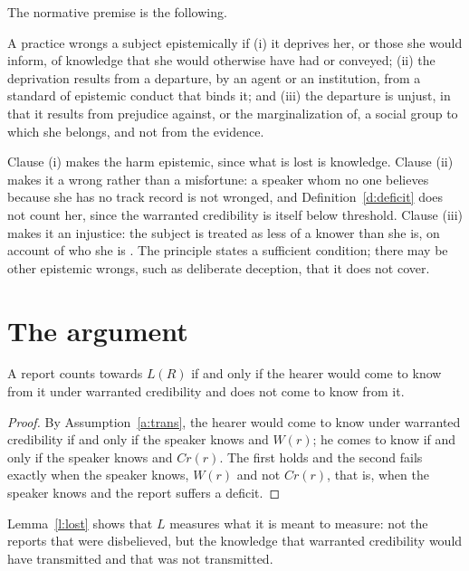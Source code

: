 \documentclass{situationist-preprint}
\begin{document}
The normative premise is the following.

\begin{principle}\label{p:wrong}
A practice wrongs a subject epistemically if (i) it deprives her, or those she would inform, of knowledge that she would otherwise have had or conveyed; (ii) the deprivation results from a departure, by an agent or an institution, from a standard of epistemic conduct that binds it; and (iii) the departure is unjust, in that it results from prejudice against, or the marginalization of, a social group to which she belongs, and not from the evidence.
\end{principle}

Clause (i) makes the harm epistemic, since what is lost is knowledge. Clause (ii) makes it a wrong rather than a misfortune: a speaker whom no one believes because she has no track record is not wronged, and Definition~\ref{d:deficit} does not count her, since the warranted credibility is itself below threshold. Clause (iii) makes it an injustice: the subject is treated as less of a knower than she is, on account of who she is \citep{Fricker2007}. The principle states a sufficient condition; there may be other epistemic wrongs, such as deliberate deception, that it does not cover.

\section{The argument}

\begin{lemma}\label{l:lost}
A report counts towards $L(R)$ if and only if the hearer would come to know from it under warranted credibility and does not come to know from it.
\end{lemma}

\begin{proof}
By Assumption~\ref{a:trans}, the hearer would come to know under warranted credibility if and only if the speaker knows and $W(r)$; he comes to know if and only if the speaker knows and $\mathit{Cr}(r)$. The first holds and the second fails exactly when the speaker knows, $W(r)$ and not $\mathit{Cr}(r)$, that is, when the speaker knows and the report suffers a deficit.
\end{proof}

Lemma~\ref{l:lost} shows that $L$ measures what it is meant to measure: not the reports that were disbelieved, but the knowledge that warranted credibility would have transmitted and that was not transmitted.
\end{document}
